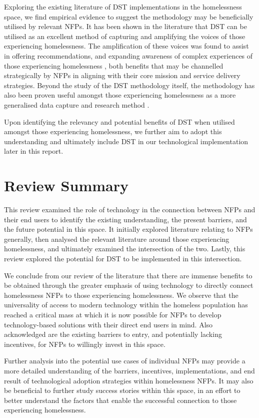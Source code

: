 Exploring the existing literature of DST implementations in the homelessness space, we find empirical evidence to suggest the methodology may be beneficially utilised by relevant NFPs. It has been shown in the literature that DST can be utilised as an excellent method of capturing and amplifying the voices of those experiencing homelessness. The amplification of these voices was found to assist in offering recommendations, and expanding awareness of complex experiences of those experiencing homelessness \cite{schneider2019voices}, both benefits that may be channelled strategically by NFPs in aligning with their core mission and service delivery strategies. Beyond the study of the DST methodology itself, the methodology has also been proven useful amongst those experiencing homelessness as a more generalised data capture and research method \cite{walsh2013aboriginal}.

Upon identifying the relevancy and potential benefits of DST when utilised amongst those experiencing homelessness, we further aim to adopt this understanding and ultimately include DST in our technological implementation later in this report.

\section{Review Summary}

This review examined the role of technology in the connection between NFPs and their end users to identify the existing understanding, the present barriers, and the future potential in this space. It initially explored literature relating to NFPs generally, then analysed the relevant literature around those experiencing homelessness, and ultimately examined the intersection of the two. Lastly, this review explored the potential for DST to be implemented in this intersection.

We conclude from our review of the literature that there are immense benefits to be obtained through the greater emphasis of using technology to directly connect homelessness NFPs to those experiencing homelessness. We observe that the universality of access to modern technology within the homeless population has reached a critical mass at which it is now possible for NFPs to develop technology-based solutions with their direct end users in mind. Also acknowledged are the existing barriers to entry, and potentially lacking incentives, for NFPs to willingly invest in this space.

Further analysis into the potential use cases of individual NFPs may provide a more detailed understanding of the barriers, incentives, implementations, and end result of technological adoption strategies within homelessness NFPs. It may also be beneficial to further study success stories within this space, in an effort to better understand the factors that enable the successful connection to those experiencing homelessness.

